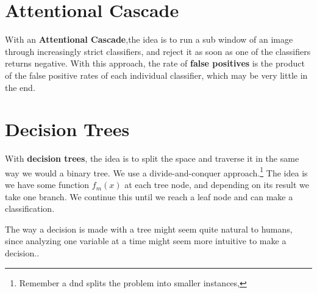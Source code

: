 \documentclass{tufte-handout}
\begin{document}
\section{Attentional Cascade}
With an \textbf{Attentional Cascade},the idea is to run a sub window of an image through increasingly strict
classifiers, and reject it as soon as one of the classifiers returns negative. With this approach, the rate
of \textbf{false positives} is the product of the false positive rates of each individual classifier, which may
be very little in the end.
\section{Decision Trees}
With \textbf{decision trees}, the idea is to split the space and traverse it in the same way we would a binary tree.
We use a divide-and-conquer approach.\footnote{Remember a dnd splits the problem into smaller instances, }
The idea is we have some function $f_{m}(x)$ at each tree node, and depending on its result we take one branch. 
We continue this until we reach a leaf node and can make a classification.

The way a decision is made with a tree might seem quite natural to humans, since analyzing one 
variable at a time might seem more intuitive to make a decision..
\end{document}
